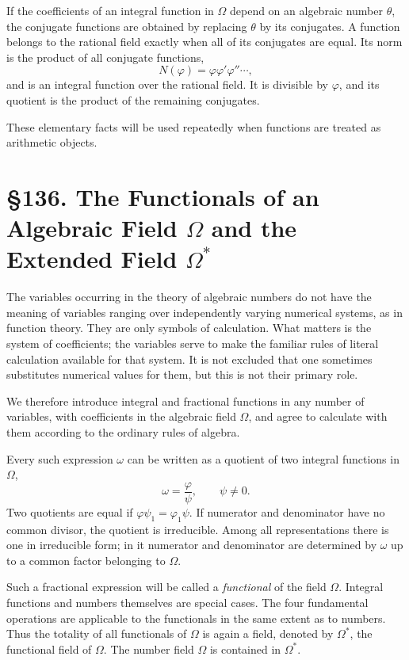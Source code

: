 \documentclass[11pt,a4paper]{book}
\newcommand{\webersection}[2]{\clearpage\section*{\S #1. #2}}
\begin{document}
If the coefficients of an integral function in \(\Omega\) depend on an algebraic number \(\theta\), the conjugate functions are obtained by replacing \(\theta\) by its conjugates.  A function belongs to the rational field exactly when all of its conjugates are equal.  Its norm is the product of all conjugate functions,
\[
 N(\varphi)=\varphi\varphi'\varphi''\cdots,
\]
and is an integral function over the rational field.  It is divisible by \(\varphi\), and its quotient is the product of the remaining conjugates.

These elementary facts will be used repeatedly when functions are treated as arithmetic objects.

\webersection{136}{The Functionals of an Algebraic Field \(\Omega\) and the Extended Field \(\Omega^*\)}

The variables occurring in the theory of algebraic numbers do not have the meaning of variables ranging over independently varying numerical systems, as in function theory.  They are only symbols of calculation.  What matters is the system of coefficients; the variables serve to make the familiar rules of literal calculation available for that system.  It is not excluded that one sometimes substitutes numerical values for them, but this is not their primary role.

We therefore introduce integral and fractional functions in any number of variables, with coefficients in the algebraic field \(\Omega\), and agree to calculate with them according to the ordinary rules of algebra.

Every such expression \(\omega\) can be written as a quotient of two integral functions in \(\Omega\),
\[
 \omega=\frac{\varphi}{\psi},
\qquad \psi\ne0.
\]
Two quotients are equal if \(\varphi\psi_1=\varphi_1\psi\).  If numerator and denominator have no common divisor, the quotient is irreducible.  Among all representations there is one in irreducible form; in it numerator and denominator are determined by \(\omega\) up to a common factor belonging to \(\Omega\).

Such a fractional expression will be called a \emph{functional} of the field \(\Omega\).  Integral functions and numbers themselves are special cases.  The four fundamental operations are applicable to the functionals in the same extent as to numbers.  Thus the totality of all functionals of \(\Omega\) is again a field, denoted by \(\Omega^*\), the functional field of \(\Omega\).  The number field \(\Omega\) is contained in \(\Omega^*\).
\end{document}
